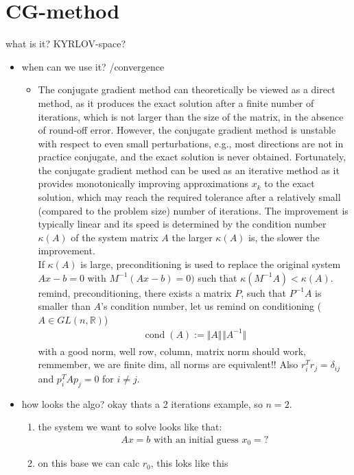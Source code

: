 \documentclass[]{scrartcl}
\newcommand{\R}{\mathbb{R}}
\newcommand{\<}{\trianglelefteq}
\newcommand{\norm}[2]{\Vert #1 \Vert_{#2}}
\DeclareMathOperator{\cond}{cond}
\begin{document}
\section*{CG-method}
what is it? KYRLOV-space?
\begin{itemize}
	\item when can we use it? /convergence
	\begin{itemize}
		\item The conjugate gradient method can theoretically be viewed as a direct method, as it produces the exact solution after a finite number of iterations, which is not larger than the size of the matrix, in the absence of round-off error. However, the conjugate gradient method is unstable with respect to even small perturbations, e.g., most directions are not in practice conjugate, and the exact solution is never obtained. Fortunately, the conjugate gradient method can be used as an iterative method as it provides monotonically improving approximations $x_k$ to the exact solution, which may reach the required tolerance after a relatively small (compared to the problem size) number of iterations.
		The improvement is typically linear and its speed is determined by the condition number $\kappa(A)$ of the system matrix $A$ the larger $\kappa(A)$ is, the slower the improvement.\\
		If $\kappa (A)$ is large, preconditioning is used to replace the original system $Ax-b = 0$ with $M^{-1}(Ax-b)= 0)$ such that $\kappa(M^{-1}A) < \kappa(A)$.
		remind, preconditioning, there exists a matrix $P$, such that $P^{-1}A$ is smaller than $A$'s condition number, let us remind on conditioning ($A \in GL(n,\R)$) 
		\begin{align*}
			\cond(A) := \norm{A}{}\norm{A^{-1}}{}
		\end{align*}
		with a good norm, well row, column, matrix norm should work, remmember, we are finite dim, all norms are equivalent!! Also $r^T_i r_j = \delta_{ij}$ and $p_i^T A p_j = 0$ for $i \neq j$. 
	\end{itemize}
	\item how looks the algo? okay thats a 2 iterations example, so $n = 2$. %
	\begin{enumerate}
		\item the system we want to solve looks like that:
		\begin{align*}
			Ax = b \text{ with an initial guess } x_0 = ?
		\end{align*}
		\item on this base we can calc $r_0$, this loks like this

\end{enumerate}
\end{itemize}
\end{document}
